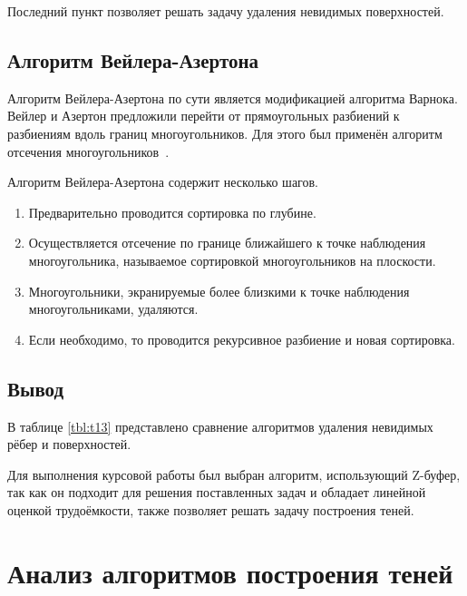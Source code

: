 Последний пункт позволяет решать задачу удаления невидимых поверхностей.

\subsection{Алгоритм Вейлера-Азертона}

Алгоритм Вейлера-Азертона по сути является модификацией алгоритма Варнока. Вейлер и Азертон предложили перейти от прямоугольных разбиений к разбиениям вдоль границ многоугольников. Для этого был применён алгоритм отсечения многоугольников~\cite{rodjers}.

Алгоритм Вейлера-Азертона содержит несколько шагов.
\begin{enumerate}
	\item Предварительно проводится сортировка по глубине.
	\item Осуществляется отсечение по границе ближайшего к точке наблюдения многоугольника, называемое сортировкой многоугольников на плоскости.
	\item Многоугольники, экранируемые более близкими к точке наблюдения многоугольниками, удаляются.
	\item Если необходимо, то проводится рекурсивное разбиение и новая сортировка.
\end{enumerate} 

\subsection*{Вывод}

В таблице \ref{tbl:t13} представлено сравнение алгоритмов удаления невидимых рёбер и поверхностей.


Для выполнения курсовой работы был выбран алгоритм, использующий Z-буфер, так как он подходит для решения поставленных задач и обладает линейной оценкой трудоёмкости, также позволяет решать задачу построения теней.

\section{Анализ алгоритмов построения теней}

